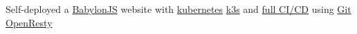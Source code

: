 {Self-deployed a \href{https://www.babylonjs.com/}{BabylonJS} website with \href{https://github.com/sachiniyer/cheap_portable_k3s\#applications}{kubernetes} \href{https://github.com/sachiniyer/cheap_portable_k3s/blob/main/README.pdf}{k3s} and \href{https://blog.sachiniyer.com/posts/1/}{full CI/CD} using \href{https://github.com/kubernetes/git-sync}{Git OpenResty}}
